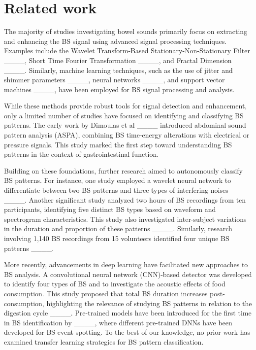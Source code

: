\section{Related work}
 The majority of studies investigating bowel sounds primarily focus on extracting and enhancing the BS signal using advanced signal processing techniques. Examples include the Wavelet Transform-Based Stationary-Non-Stationary Filter ____, Short Time Fourier Transformation ____, and Fractal Dimension ____. Similarly, machine learning techniques, such as the use of jitter and shimmer parameters ____, neural networks ____, and support vector machines ____, have been employed for BS signal processing and analysis.

While these methods provide robust tools for signal detection and enhancement, only a limited number of studies have focused on identifying and classifying BS patterns. The early work by Dimoulas et al ____ introduced abdominal sound pattern analysis (ASPA), combining BS time-energy alterations with electrical or pressure signals. This study marked the first step toward understanding BS patterns in the context of gastrointestinal function.

Building on these foundations, further research aimed to autonomously classify BS patterns. For instance, one study employed a wavelet neural network to differentiate between two BS patterns and three types of interfering noises ____. Another significant study analyzed two hours of BS recordings from ten participants, identifying five distinct BS types based on waveform and spectrogram characteristics. This study also investigated inter-subject variations in the duration and proportion of these patterns ____. Similarly, research involving 1,140 BS recordings from 15 volunteers identified four unique BS patterns ____.

More recently, advancements in deep learning have facilitated new approaches to BS analysis. A convolutional neural network (CNN)-based detector was developed to identify four types of BS and to investigate the acoustic effects of food consumption. This study proposed that total BS duration increases post-consumption, highlighting the relevance of studying BS patterns in relation to the digestion cycle ____.
Pre-trained models have been introduced for the first time in BS identification by ____, where different pre-trained DNNs have been developed for BS event spotting. To the best of our knowledge, no prior work has examined transfer learning strategies for BS pattern classification.